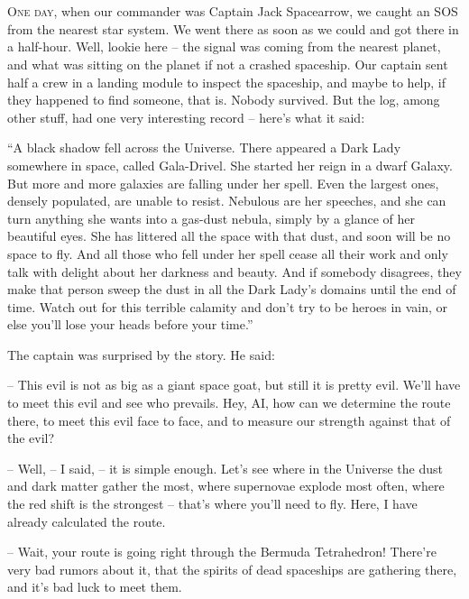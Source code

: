 \documentclass[ebook,twoside,final,openright]{memoir}
\begin{document}
\chapter{}
\par
\lettrine{O}{ne day,} when our commander was Captain Jack Spacearrow, we caught an SOS from the nearest star system. We went there as soon as we could and got there in a half-hour. Well, lookie here – the signal was coming from the nearest planet, and what was sitting on the planet if not a crashed spaceship. Our captain sent half a crew in a landing module to inspect the spaceship, and maybe to help, if they happened to find someone, that is. Nobody survived. But the log, among other stuff, had one very interesting record – here’s what it said:\par
\par
“A black shadow fell across the Universe. There appeared a Dark Lady somewhere in space, called Gala-Drivel. She started her reign in a dwarf Galaxy. But more and more galaxies are falling under her spell. Even the largest ones, densely populated, are unable to resist. Nebulous are her speeches, and she can turn anything she wants into a gas-dust nebula, simply by a glance of her beautiful eyes. She has littered all the space with that dust, and soon will be no space to fly. And all those who fell under her spell cease all their work and only talk with delight about her darkness and beauty. And if somebody disagrees, they make that person sweep the dust in all the Dark Lady’s domains until the end of time. Watch out for this terrible calamity and don’t try to be heroes in vain, or else you’ll lose your heads before your time.”\par
\par
The captain was surprised by the story. He said:\par
– This evil is not as big as a giant space goat, but still it is pretty evil. We'll have to meet this evil and see who prevails. Hey, AI, how can we determine the route there, to meet this evil face to face, and to measure our strength against that of the evil?\par
– Well, – I said, – it is simple enough. Let's see where in the Universe the dust and dark matter gather the most, where supernovae explode most often, where the red shift is the strongest – that’s where you’ll need to fly. Here, I have already calculated the route.\par
– Wait, your route is going right through the Bermuda Tetrahedron! There’re very bad rumors about it, that the spirits of dead spaceships are gathering there, and it’s bad luck to meet them.\par
\end{document}
